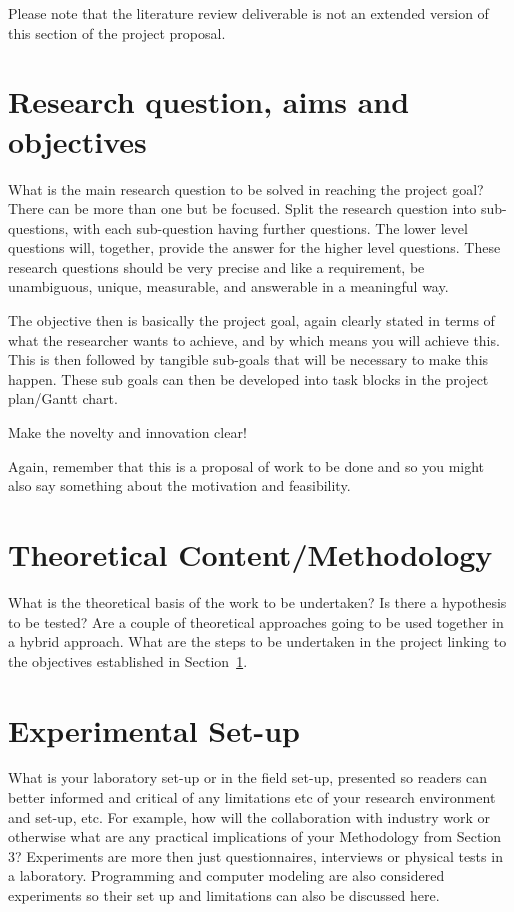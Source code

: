 \documentclass{article}
\begin{document}
Please note that the literature review deliverable is not an extended version of this section of the project proposal.

\section{Research question, aims and objectives}
\label{sec:objective}

What is the main research question to be solved in reaching the project goal? There can be more than one but be focused. Split the research question into sub-questions, with each sub-question having further questions. The lower level questions will, together, provide the answer for the higher level questions. These research questions should be very precise and like a requirement, be unambiguous, unique, measurable, and answerable in a meaningful way.

The objective then is basically the project goal, again clearly stated in terms of what the researcher wants to achieve, and by which means you will achieve this. This is then followed by tangible sub-goals that will be necessary to make this happen. These sub goals can then be developed into task blocks in the project plan/Gantt chart.

Make the novelty and innovation clear!

Again, remember that this is a proposal of work to be done and so you might also say something about the motivation and feasibility.


\section{Theoretical Content/Methodology}
\label{sec:theory}

What is the theoretical basis of the work to be undertaken? Is there a hypothesis to be tested? Are a couple of theoretical approaches going to be used together in a hybrid approach. What are the steps to be undertaken in the project linking to the objectives established in Section~\ref{sec:objective}.

\section{Experimental Set-up}
\label{sec:experiment}

What is your laboratory set-up or in the field set-up, presented so readers can better informed and critical of any limitations etc of your research environment and set-up, etc. For example, how will the collaboration with industry work or otherwise what are any practical implications of your Methodology from Section 3? Experiments are more then just questionnaires, interviews or physical tests in a laboratory. Programming and computer modeling are also considered experiments so their set up and limitations can also be discussed here.
\end{document}
